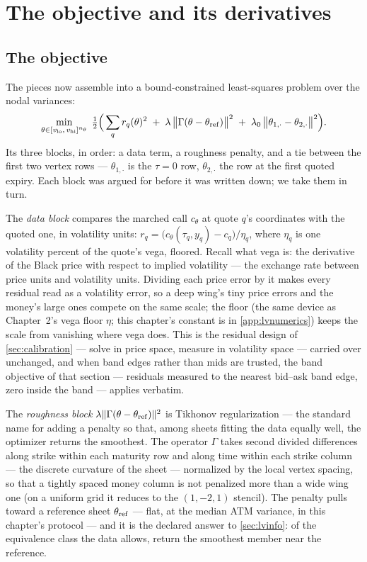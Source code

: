 \section{The objective and its derivatives}
\label{sec:lvcalib}

\subsection{The objective}

The pieces now assemble into a bound-constrained least-squares problem
over the nodal variances:
\begin{equation}
\min_{\theta\in[v_{\rm lo},\,v_{\rm hi}]^{n_\theta}}
\;\tfrac12\Big(
\sum_{q}r_q(\theta)^{2}
\;+\;\lambda\,\big\|\Gamma(\theta-\theta_{\rm ref})\big\|^{2}
\;+\;\lambda_0\,\big\|\theta_{1,\cdot}-\theta_{2,\cdot}\big\|^{2}
\Big).
\label{eq:lvobjective}
\end{equation}
Its three blocks, in order: a data term, a roughness penalty, and a
tie between the first two vertex rows --- $\theta_{1,\cdot}$ is the
$\tau=0$ row, $\theta_{2,\cdot}$ the row at the first quoted expiry.
Each block was argued for before it was written down; we
take them in turn.

The \emph{data block} compares the marched call $c_\theta$ at quote
$q$'s coordinates with the quoted one, in volatility units:
$r_q=\big(c_\theta(\tau_q,y_q)-c_q\big)/\eta_q$, where $\eta_q$ is one
volatility percent of the quote's vega, floored.  Recall what vega is:
the derivative of the Black price with respect to implied volatility
--- the exchange rate between price units and volatility units.
Dividing each price error by it makes every residual read as a
volatility error, so a deep wing's tiny price errors and the money's
large ones compete on the same scale; the floor (the same device as
Chapter~2's vega floor $\eta$; this chapter's constant is in
\cref{app:lvnumerics}) keeps the scale from vanishing where vega does.
This is the residual design of \cref{sec:calibration} --- solve in
price space, measure in volatility space --- carried over unchanged,
and when band edges rather than mids are trusted, the band objective
of that section --- residuals measured to the nearest bid--ask band
edge, zero inside the band --- applies verbatim.

The \emph{roughness block} $\lambda\|\Gamma(\theta-\theta_{\rm ref})\|^{2}$
is Tikhonov regularization --- the standard name for adding a penalty
so that, among sheets fitting the data equally well, the optimizer
returns the smoothest.  The operator $\Gamma$ takes second divided
differences along strike within each maturity row and along time
within each strike column --- the discrete curvature of the sheet ---
normalized by the local vertex spacing, so that a tightly spaced money
column is not penalized more than a wide wing one (on a uniform grid
it reduces to the $(1,-2,1)$ stencil).  The penalty pulls toward a
reference sheet $\theta_{\rm ref}$ --- flat, at the median ATM
variance, in this chapter's protocol --- and it is the declared answer
to \cref{sec:lvinfo}: of the equivalence class the data allows, return
the smoothest member near the reference.

